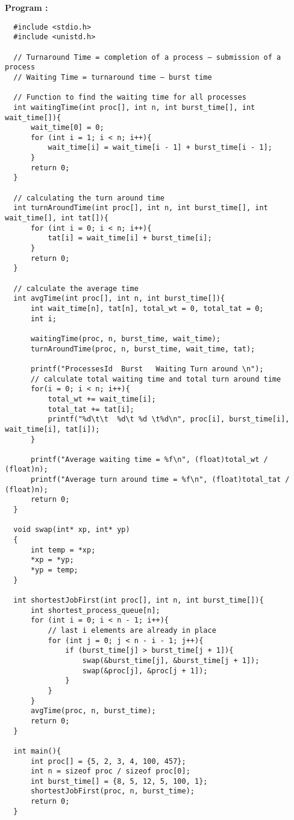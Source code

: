 \documentclass[journal,onecolumn]{IEEEtran}
\begin{document}
\textbf{Program : }
\begin{verbatim}
  #include <stdio.h>
  #include <unistd.h>
  
  // Turnaround Time = completion of a process – submission of a process
  // Waiting Time = turnaround time – burst time
  
  // Function to find the waiting time for all processes
  int waitingTime(int proc[], int n, int burst_time[], int wait_time[]){
      wait_time[0] = 0;
      for (int i = 1; i < n; i++){
          wait_time[i] = wait_time[i - 1] + burst_time[i - 1];
      }
      return 0;
  }
  
  // calculating the turn around time
  int turnAroundTime(int proc[], int n, int burst_time[], int wait_time[], int tat[]){
      for (int i = 0; i < n; i++){
          tat[i] = wait_time[i] + burst_time[i];
      }
      return 0;
  }
  
  // calculate the average time
  int avgTime(int proc[], int n, int burst_time[]){
      int wait_time[n], tat[n], total_wt = 0, total_tat = 0;
      int i;
  
      waitingTime(proc, n, burst_time, wait_time);
      turnAroundTime(proc, n, burst_time, wait_time, tat);
  
      printf("ProcessesId  Burst   Waiting Turn around \n");
      // calculate total waiting time and total turn around time
      for(i = 0; i < n; i++){
          total_wt += wait_time[i];
          total_tat += tat[i];
          printf("%d\t\t  %d\t %d \t%d\n", proc[i], burst_time[i], wait_time[i], tat[i]);
      }
  
      printf("Average waiting time = %f\n", (float)total_wt / (float)n);
      printf("Average turn around time = %f\n", (float)total_tat / (float)n);
      return 0;
  }
  
  void swap(int* xp, int* yp)
  {
      int temp = *xp;
      *xp = *yp;
      *yp = temp;
  }
  
  int shortestJobFirst(int proc[], int n, int burst_time[]){
      int shortest_process_queue[n];
      for (int i = 0; i < n - 1; i++){
          // last i elements are already in place
          for (int j = 0; j < n - i - 1; j++){
              if (burst_time[j] > burst_time[j + 1]){
                  swap(&burst_time[j], &burst_time[j + 1]);
                  swap(&proc[j], &proc[j + 1]);
              }
          }
      }
      avgTime(proc, n, burst_time);
      return 0;
  }
  
  int main(){
      int proc[] = {5, 2, 3, 4, 100, 457};
      int n = sizeof proc / sizeof proc[0];
      int burst_time[] = {8, 5, 12, 5, 100, 1};
      shortestJobFirst(proc, n, burst_time);
      return 0;
  }
  
\end{verbatim}
\end{document}
